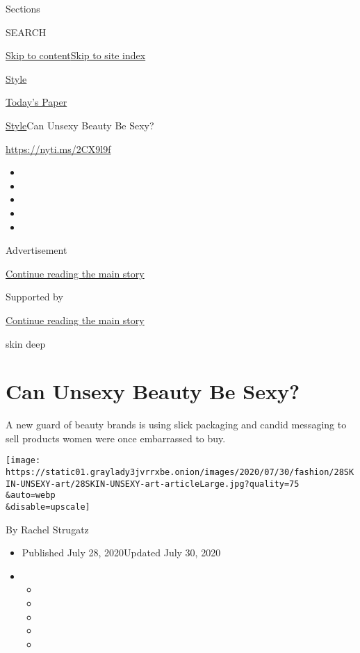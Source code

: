 Sections

SEARCH

\protect\hyperlink{site-content}{Skip to
content}\protect\hyperlink{site-index}{Skip to site index}

\href{https://www.nytimes3xbfgragh.onion/section/style}{Style}

\href{https://myaccount.nytimes3xbfgragh.onion/auth/login?response_type=cookie\&client_id=vi}{}

\href{https://www.nytimes3xbfgragh.onion/section/todayspaper}{Today's
Paper}

\href{/section/style}{Style}\textbar{}Can Unsexy Beauty Be Sexy?

\url{https://nyti.ms/2CX9l9f}

\begin{itemize}
\item
\item
\item
\item
\item
\end{itemize}

Advertisement

\protect\hyperlink{after-top}{Continue reading the main story}

Supported by

\protect\hyperlink{after-sponsor}{Continue reading the main story}

skin deep

\hypertarget{can-unsexy-beauty-be-sexy}{%
\section{Can Unsexy Beauty Be Sexy?}\label{can-unsexy-beauty-be-sexy}}

A new guard of beauty brands is using slick packaging and candid
messaging to sell products women were once embarrassed to buy.

\texttt{[image: https://static01.graylady3jvrrxbe.onion/images/2020/07/30/fashion/28SKIN-UNSEXY-art/28SKIN-UNSEXY-art-articleLarge.jpg?quality=75\\\&auto=webp\\\&disable=upscale]}

By Rachel Strugatz

\begin{itemize}
\item
  Published July 28, 2020Updated July 30, 2020
\item
  \begin{itemize}
  \item
  \item
  \item
  \item
  \item
  \end{itemize}
\end{itemize}

